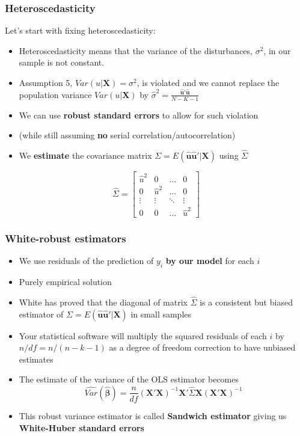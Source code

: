 \documentclass[xcolor=table,dvipsnames]{beamer}
\begin{document}
\begin{frame}
\frametitle{Heteroscedasticity}
Let's start with fixing heteroscedasticity:
\begin{itemize}
\item Heteroscedasticity means that the variance of the disturbances, $\sigma^2$, in our sample is not constant. \pause
\item Assumption 5,  $Var(u|\mathbf{X})=\sigma^2$, is violated and we cannot replace the population variance $Var(u|\mathbf{X})$ by $\hat{\sigma}^2=\frac{\mathbf{\hat{u}'\hat{u}}}{N-K-1}$ \pause
\item We can use \textbf{robust standard errors} to allow for such violation
\item[] (while still assuming \textbf{no} serial correlation/autocorrelation) \pause
\item We \textbf{estimate} the covariance matrix $\Sigma=E(\mathbf{\hat{u}}\mathbf{\hat{u}}'|\mathbf{X})$ using $\hat{\Sigma}$
\end{itemize}
\[\hat{\Sigma}=
\left[
\begin{array}{cccc}
\hat{u}^2	& 0			& \ldots	& 0\\
0 			& \hat{u}^2 & \ldots	& 0\\
\vdots 		& \vdots	& \ddots 	& \vdots\\
0 			& 0			& \ldots	& \hat{u}^2 
\end{array}
\right]
\]

\end{frame}


\begin{frame}
\frametitle{White-robust estimators}
\begin{itemize}
\item We use residuals of the prediction of $y_i$ \textbf{by our model} for each $i$ \pause
\item Purely empirical solution \pause
\item White has proved that the diagonal of matrix $\hat{\Sigma}$ is a consistent but biased estimator of $\Sigma=E(\mathbf{\hat{u}}\mathbf{\hat{u}}'|\mathbf{X})$ in small samples \pause
\item Your statistical software will multiply the squared residuals of each $i$ by $n/df=n/(n-k-1)$ as a degree of freedom correction to have unbiased estimates \pause
\item The estimate of the variance of the OLS estimator becomes
$$\widehat{Var}(\mathbf{\hat{\beta}})=\frac{n}{df}(\mathbf{X'X})^{-1} \mathbf{X}' \hat{\Sigma} \mathbf{X} (\mathbf{X}'\mathbf{X})^{-1}$$
\item This robust variance estimator is called \textbf{Sandwich estimator} giving us \textbf{White-Huber standard errors}
\end{itemize}
\end{frame}
\end{document}
